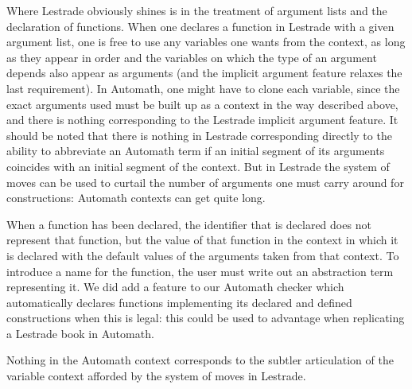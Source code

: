 \documentclass[12pt]{article}
\begin{document}
Where Lestrade obviously shines is in the treatment of argument lists and the declaration of functions.  When one declares a function in Lestrade with a given argument list, one is free
to use any variables one wants from the context, as long as they appear in order and the variables on which the type of an argument depends also appear as arguments (and the implicit argument feature relaxes the last requirement).  In Automath,
one might have to clone each variable, since the exact arguments used must be built up as a context in the way described above, and there is nothing corresponding to the Lestrade implicit argument feature.  It should be noted that there is nothing in Lestrade corresponding directly to the ability to abbreviate an Automath term if an initial segment of its arguments
coincides with an initial segment of the context.  But in Lestrade the system of moves can be used to curtail the number of arguments one must carry around for constructions:  Automath contexts can get quite long.

When a function has been declared, the identifier that is declared does not represent that function, but the value of that function in the context in which it is declared with the default values of the arguments taken from that context.  To introduce a name for the function, the user must write out an abstraction term representing it.  We did add a feature to our
Automath checker which automatically declares functions implementing its declared and defined constructions when this is legal:  this could be used to advantage when replicating a Lestrade book in Automath.

Nothing in the Automath context corresponds to the subtler articulation of the variable context afforded by the system of moves in Lestrade.
\end{document}
